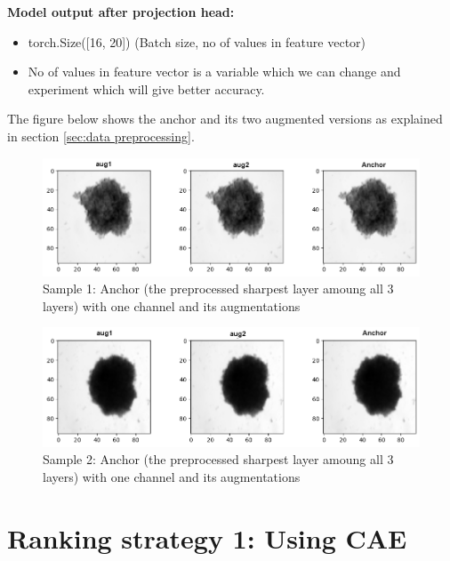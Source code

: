 \textbf{Model output after projection head:}
\begin{itemize}
  \item torch.Size([16, 20])  (Batch size, no of values in feature vector)  
  \item No of values in feature vector is a variable which we can change and experiment which will give better accuracy.
\end{itemize}

The figure below shows the anchor and its two augmented versions as explained in section \ref{sec:data preprocessing}.
\begin{figure}[H]
  \centering
  \includegraphics[width=0.9\linewidth]{figures/1_1.png} %
  \caption{Sample 1: Anchor (the preprocessed sharpest layer amoung all 3 layers) with one channel and its augmentations}
  \label{fig:1doutput1}
\end{figure}

\begin{figure}[H]
  \centering
  \includegraphics[width=0.9\linewidth]{figures/1_2.png} %
  \caption{Sample 2: Anchor (the preprocessed sharpest layer amoung all 3 layers) with one channel and its augmentations}
  \label{fig:1doutput3}
\end{figure}
\section{Ranking strategy 1: Using CAE}

